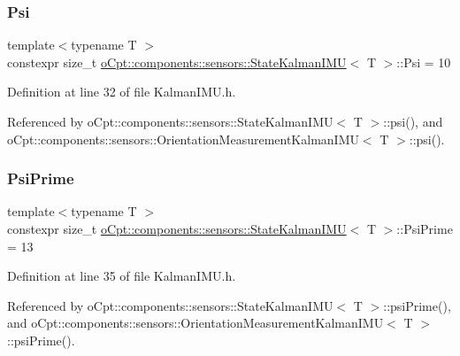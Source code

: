 \subsubsection{\texorpdfstring{Psi}{Psi}}
{\footnotesize\ttfamily template$<$typename T $>$ \\
constexpr size\+\_\+t \hyperlink{classo_cpt_1_1components_1_1sensors_1_1_state_kalman_i_m_u}{o\+Cpt\+::components\+::sensors\+::\+State\+Kalman\+I\+MU}$<$ T $>$\+::Psi = 10\hspace{0.3cm}{\ttfamily [static]}}



Definition at line 32 of file Kalman\+I\+M\+U.\+h.



Referenced by o\+Cpt\+::components\+::sensors\+::\+State\+Kalman\+I\+M\+U$<$ T $>$\+::psi(), and o\+Cpt\+::components\+::sensors\+::\+Orientation\+Measurement\+Kalman\+I\+M\+U$<$ T $>$\+::psi().

\hypertarget{classo_cpt_1_1components_1_1sensors_1_1_state_kalman_i_m_u_ae55de2c7760d25336426afe7512e3825}{}\label{classo_cpt_1_1components_1_1sensors_1_1_state_kalman_i_m_u_ae55de2c7760d25336426afe7512e3825} 
\subsubsection{\texorpdfstring{Psi\+Prime}{PsiPrime}}
{\footnotesize\ttfamily template$<$typename T $>$ \\
constexpr size\+\_\+t \hyperlink{classo_cpt_1_1components_1_1sensors_1_1_state_kalman_i_m_u}{o\+Cpt\+::components\+::sensors\+::\+State\+Kalman\+I\+MU}$<$ T $>$\+::Psi\+Prime = 13\hspace{0.3cm}{\ttfamily [static]}}



Definition at line 35 of file Kalman\+I\+M\+U.\+h.



Referenced by o\+Cpt\+::components\+::sensors\+::\+State\+Kalman\+I\+M\+U$<$ T $>$\+::psi\+Prime(), and o\+Cpt\+::components\+::sensors\+::\+Orientation\+Measurement\+Kalman\+I\+M\+U$<$ T $>$\+::psi\+Prime().

\hypertarget{classo_cpt_1_1components_1_1sensors_1_1_state_kalman_i_m_u_a9abd5adb833afbc4bc71690326d39161}{}\label{classo_cpt_1_1components_1_1sensors_1_1_state_kalman_i_m_u_a9abd5adb833afbc4bc71690326d39161} 
